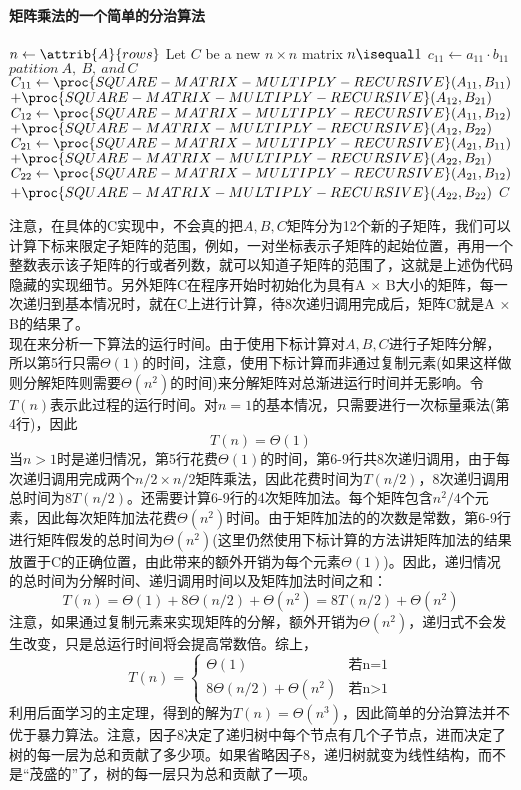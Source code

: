 \documentclass[a4paper,11pt]{article}
\begin{document}
\paragraph*{矩阵乘法的一个简单的分治算法}
\begin{codebox}
	\li $n \gets \attrib{A}{rows}$
	\li Let $C$ be a new $n \times n$ matrix
	\li \If $n \isequal 1$
	\li		\Then $c_{11} \gets a_{11} \cdot b_{11}$
	\li		\Else $patition\ A,\ B,\ and \ C$
	\li			$C_{11} \gets \proc{SQUARE-MATRIX-MULTIPLY-RECURSIVE}(A_{11},B_{11})$\\
	\>\>$+\proc{SQUARE-MATRIX-MULTIPLY-RECURSIVE}(A_{12},B_{21})$
	\li			$C_{12} \gets \proc{SQUARE-MATRIX-MULTIPLY-RECURSIVE}(A_{11},B_{12})$\\
	\>\>$+\proc{SQUARE-MATRIX-MULTIPLY-RECURSIVE}(A_{12},B_{22})$
	\li			$C_{21} \gets	\proc{SQUARE-MATRIX-MULTIPLY-RECURSIVE}(A_{21},B_{11})$\\
	\>\>$+\proc{SQUARE-MATRIX-MULTIPLY-RECURSIVE}(A_{22},B_{21})$
	\li			$C_{22} \gets \proc{SQUARE-MATRIX-MULTIPLY-RECURSIVE}(A_{21},B_{12})$\\
	\>\>$+\proc{SQUARE-MATRIX-MULTIPLY-RECURSIVE}(A_{22},B_{22})$
				\End
	\li	\Return $C$
\end{codebox}
注意，在具体的C实现中，不会真的把$A,B,C$矩阵分为12个新的子矩阵，我们可以计算下标来限定子矩阵的范围，例如，一对坐标表示子矩阵的起始位置，再用一个整数表示该子矩阵的行或者列数，就可以知道子矩阵的范围了，这就是上述伪代码隐藏的实现细节。另外矩阵C在程序开始时初始化为具有A $\times$ B大小的矩阵，每一次递归到基本情况时，就在C上进行计算，待8次递归调用完成后，矩阵C就是A $\times$ B的结果了。\\
现在来分析一下算法的运行时间。由于使用下标计算对$A,B,C$进行子矩阵分解，所以第5行只需$\Theta(1)$的时间，注意，使用下标计算而非通过复制元素(如果这样做则分解矩阵则需要$\Theta(n^2)$的时间)来分解矩阵对总渐进运行时间并无影响。令$T(n)$表示此过程的运行时间。对$n=1$的基本情况，只需要进行一次标量乘法(第4行)，因此
\[
	T(n) = \Theta(1)
\]
当$n>1$时是递归情况，第5行花费$\Theta(1)$的时间，第6-9行共8次递归调用，由于每次递归调用完成两个$n/2 \times n/2$矩阵乘法，因此花费时间为$T(n/2)$，8次递归调用总时间为$8T(n/2)$。还需要计算6-9行的4次矩阵加法。每个矩阵包含$n^2/4$个元素，因此每次矩阵加法花费$\Theta(n^2)$时间。由于矩阵加法的的次数是常数，第6-9行进行矩阵假发的总时间为$\Theta(n^2)$(这里仍然使用下标计算的方法讲矩阵加法的结果放置于C的正确位置，由此带来的额外开销为每个元素$\Theta(1)$)。因此，递归情况的总时间为分解时间、递归调用时间以及矩阵加法时间之和：
\[
	T(n) = \Theta(1)+8\Theta(n/2)+\Theta(n^2)=8T(n/2)+\Theta(n^2)
\]
注意，如果通过复制元素来实现矩阵的分解，额外开销为$\Theta(n^2)$，递归式不会发生改变，只是总运行时间将会提高常数倍。综上，
\[
	T(n) = 
	\begin{cases}
	\Theta(1) & \text{若n=1}\\
	8\Theta(n/2)+\Theta(n^2) & \text{若n>1}
	\end{cases}
\]
利用后面学习的主定理，得到的解为$T(n)=\Theta(n^3)$，因此简单的分治算法并不优于暴力算法。注意，因子8决定了递归树中每个节点有几个子节点，进而决定了树的每一层为总和贡献了多少项。如果省略因子8，递归树就变为线性结构，而不是“茂盛的”了，树的每一层只为总和贡献了一项。
\end{document}
